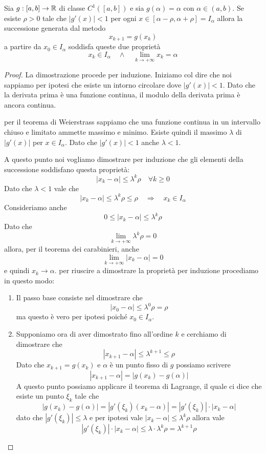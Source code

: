 \begin{theorem}\label{th: punto_fisso}
	Sia $g : [a, b] \to \mathbb{R}$ di classe $C^1 ([a, b])$ e sia $g(\alpha) = \alpha$ con $\alpha \in (a,b)$. Se esiste
	$\rho > 0$ tale che $|g'(x)| < 1$ per ogni $x \in [\alpha - \rho, \alpha + \rho] = I_\alpha$ allora la
	successione generata dal metodo
	\[ x_{k+1} = g(x_k) \]
	a partire da $x_0 \in I_\alpha$ soddisfa queste due proprietà
	\[ x_k \in I_\alpha \quad \wedge \quad \lim_{k \to +\infty} x_k = \alpha \]
	\begin{proof}
		La dimostrazione procede per induzione. Iniziamo col dire che noi sappiamo per ipotesi che esiste un
		intorno circolare dove $|g'(x)| < 1$. Dato che la derivata prima è una funzione continua, il modulo
		della derivata prima è ancora continua.

		per il teorema di Weierstrass sappiamo che una funzione continua in un intervallo chiuso e limitato
		ammette massimo e minimo. Esiste quindi il massimo $\lambda$ di $|g'(x)|$ per $x \in I_\alpha$.
		Dato che $|g'(x)| < 1$ anche $\lambda < 1$.

		A questo punto noi vogliamo dimostrare per induzione che gli elementi della successione soddisfano
		questa proprietà:
		\[ |x_k - \alpha| \leq \lambda^k \rho \quad \forall k \geq 0 \]
		Dato che $\lambda < 1$ vale che
		\[ |x_k - \alpha| \leq \lambda^k \rho \leq \rho \quad \Rightarrow \quad x_k \in I_\alpha \]
		Consideriamo anche
		\[ 0 \leq |x_k - \alpha| \leq \lambda^k \rho \]
		Dato che
		\[ \lim_{k \to +\infty} \lambda^k \rho = 0\]
		allora, per il teorema dei carabinieri, anche
		\[ \lim_{k \to +\infty} |x_k - \alpha| = 0 \]
		e quindi $x_k \to \alpha$. per riuscire a dimostrare la proprietà per induzione procediamo in questo modo:
		\begin{enumerate}
			\item Il passo base consiste nel dimostrare che
			      \[ |x_0 - \alpha| \leq \lambda^0 \rho = \rho \]
			      ma questo è vero per ipotesi poiché $x_0 \in I_\alpha$.
			\item Supponiamo ora di aver dimostrato fino all'ordine $k$ e cerchiamo di dimostrare che
			      \[ |x_{k+1} - \alpha| \leq \lambda^{k+1} \leq \rho \]
			      Dato che $x_{k+1} = g(x_k)$ e $\alpha$ è un punto fisso di $g$ possiamo scrivere
			      \[ |x_{k+1} - \alpha| = |g(x_k) - g(\alpha)| \]
			      A questo punto possiamo applicare il teorema di Lagrange, il quale ci dice che esiste un punto
			      $\xi_k$ tale che
			      \[ |g(x_k) - g(\alpha)| = |g'(\xi_k) (x_k - \alpha)| = |g'(\xi_k)| \cdot |x_k - \alpha| \]
			      dato che $|g'(\xi_k)| \leq \lambda$ e per ipotesi vale $|x_k - \alpha| \leq \lambda^k \rho$
			      allora vale
			      \[ |g'(\xi_k)| \cdot |x_k - \alpha| \leq \lambda \cdot \lambda^k \rho = \lambda^{k+1} \rho \]
		\end{enumerate}
	\end{proof}
\end{theorem}

